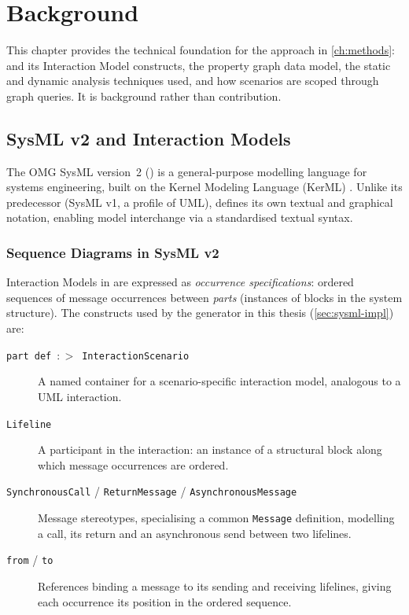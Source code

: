 \chapter{Background}\label{ch:background}

This chapter provides the technical foundation for the approach in
\cref{ch:methods}: \sysml and its Interaction Model constructs, the
property graph data model, the static and dynamic analysis techniques
used, and how scenarios are scoped through graph queries. It is
background rather than contribution.

\section{SysML v2 and Interaction Models}\label{sec:sysml}

The \acl{OMG} \acl{SysML} version~2 (\sysml) is a general-purpose
modelling language for systems engineering, built on the Kernel Modeling
Language (\ac{KerML}) \cite{omg:sysmlv2}. Unlike its predecessor (SysML
v1, a profile of UML), \sysml defines its own textual and graphical
notation, enabling model interchange via a standardised textual syntax.

\subsection{Sequence Diagrams in SysML v2}

Interaction Models in \sysml are expressed as \emph{occurrence
specifications}: ordered sequences of message occurrences between
\emph{parts} (instances of blocks in the system structure). The
constructs used by the generator in this thesis (\cref{sec:sysml-impl})
are:
\begin{description}
  \item[\texttt{part def}~$:>$~\texttt{InteractionScenario}] A named
    container for a scenario-specific interaction model, analogous to a
    \ac{UML} interaction.
  \item[\texttt{Lifeline}] A participant in the interaction: an instance
    of a structural block along which message occurrences are ordered.
  \item[\texttt{SynchronousCall} / \texttt{ReturnMessage} /
    \texttt{AsynchronousMessage}] Message stereotypes, specialising a
    common \texttt{Message} definition, modelling a call, its return and
    an asynchronous send between two lifelines.
  \item[\texttt{from} / \texttt{to}] References binding a message to its
    sending and receiving lifelines, giving each occurrence its position
    in the ordered sequence.
\end{description}

